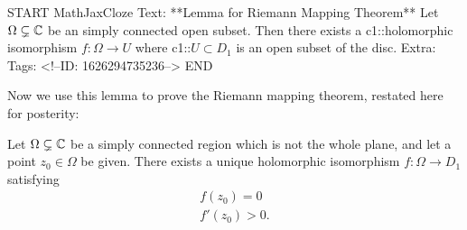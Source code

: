 \documentclass{memoir}
\begin{document}
\begin{anki}
START
MathJaxCloze
Text: **Lemma for Riemann Mapping Theorem**
Let \(\Omega \subsetneq \mathbb{C}\) be an simply connected open subset. Then there exists a {{c1::holomorphic isomorphism}} \(f:\Omega \to U\) where {{c1::\(U\subset D_1\) is an open subset of the disc}}.
Extra: 
Tags: 
<!--ID: 1626294735236-->
END
\end{anki}


Now we use this lemma to prove the Riemann mapping theorem, restated here for posterity:

\begin{thm}
	Let \(\Omega \subsetneq \mathbb{C}\) be a  simply connected region which is not the whole plane, and let a point \(z_0 \in \Omega \) be given. There exists a unique holomorphic isomorphism \(f:\Omega \to D_1\) satisfying
	\begin{align*}
		f(z_0) = 0\\
		f'(z_0)>0.
	\end{align*}
\end{thm}
\end{document}
